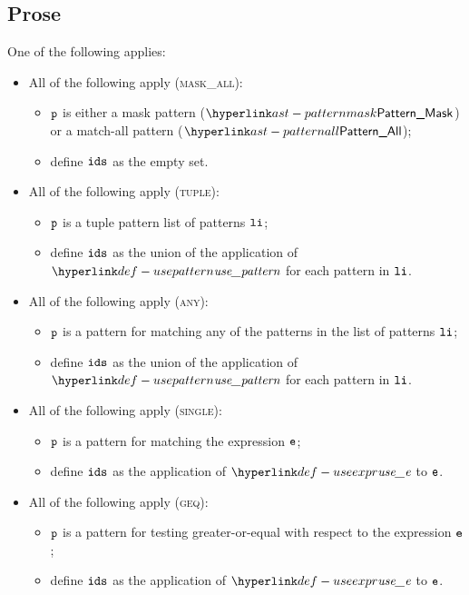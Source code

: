 \subsection{Prose}
One of the following applies:
\begin{itemize}
  \item All of the following apply (\textsc{mask\_all}):
  \begin{itemize}
    \item $\texttt{p}$ is either a mask pattern ($\PatternMask$) or a match-all pattern ($\PatternAll$);
    \item define $\texttt{ids}$ as the empty set.
  \end{itemize}

  \item All of the following apply (\textsc{tuple}):
  \begin{itemize}
    \item $\texttt{p}$ is a tuple pattern list of patterns $\texttt{li}$;
    \item define $\texttt{ids}$ as the union of the application of $\usepattern$ for each pattern in $\texttt{li}$.
  \end{itemize}

  \item All of the following apply (\textsc{any}):
  \begin{itemize}
    \item $\texttt{p}$ is a pattern for matching any of the patterns in the list of patterns $\texttt{li}$;
    \item define $\texttt{ids}$ as the union of the application of $\usepattern$ for each pattern in $\texttt{li}$.
  \end{itemize}

  \item All of the following apply (\textsc{single}):
  \begin{itemize}
    \item $\texttt{p}$ is a pattern for matching the expression $\texttt{e}$;
    \item define $\texttt{ids}$ as the application of $\useexpr$ to $\texttt{e}$.
  \end{itemize}

  \item All of the following apply (\textsc{geq}):
  \begin{itemize}
    \item $\texttt{p}$ is a pattern for testing greater-or-equal with respect to the expression $\texttt{e}$;
    \item define $\texttt{ids}$ as the application of $\useexpr$ to $\texttt{e}$.
  \end{itemize}


\end{itemize}
